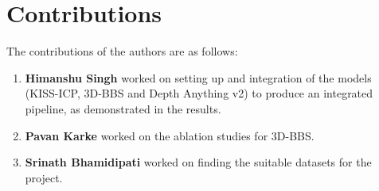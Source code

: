 \section{Contributions}
\label{sec:contributions}

The contributions of the authors are as follows:

\begin{enumerate}
    \item \textbf{Himanshu Singh} worked on setting up and integration of the models (KISS-ICP, 3D-BBS and Depth Anything v2) to produce an integrated pipeline, as demonstrated in the results.
    \item \textbf{Pavan Karke} worked on the ablation studies for 3D-BBS.
    \item \textbf{Srinath Bhamidipati} worked on finding the suitable datasets for the project.
\end{enumerate}
